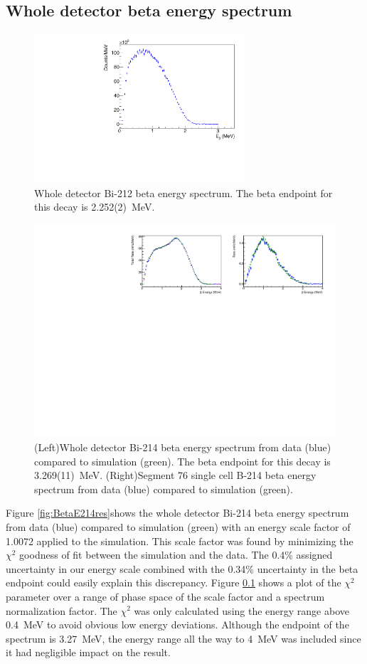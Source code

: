 \subsection{Whole detector beta energy spectrum}
\begin{figure}[!h]
\centering
\includegraphics[width=0.7\textwidth]{figures/PubBiPo212BetaE.pdf}
\caption{\label{fig:BetaE212}Whole detector Bi-212 beta energy spectrum. The beta endpoint for this decay is 2.252(2)~MeV.}
\end{figure}
\begin{figure}[!h]
\centering
\includegraphics[width=1.0\textwidth]{figures/PubBi214BetaEsimCompare.pdf}
\caption{\label{fig:BetaE214}(Left)Whole detector Bi-214 beta energy spectrum from data (blue) compared to simulation (green). The beta endpoint for this decay is 3.269(11)~MeV. (Right)Segment 76 single cell B-214 beta energy spectrum from data (blue) compared to simulation (green).}
\end{figure}
Figure \ref{fig:BetaE214res}shows the whole detector Bi-214 beta energy spectrum from data (blue) compared to simulation (green) with an energy scale factor of 1.0072 applied to the simulation. This scale factor was found by minimizing the $\chi^2$ goodness of fit between the simulation and the data. The 0.4\% assigned uncertainty in our energy scale combined with the 0.34\%  uncertainty in the beta endpoint could easily explain this discrepancy.   Figure \ref{} shows a plot of the $\chi^2$ parameter over a range of phase space of the scale factor and a spectrum normalization factor. The $\chi^2$ was only calculated using the energy range above 0.4~MeV to avoid obvious low energy deviations. Although the endpoint of the spectrum is 3.27~MeV, the energy range all the way to 4~MeV was included since it had negligible impact on the result.   
